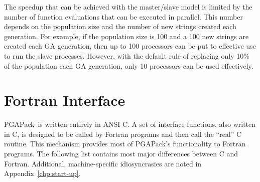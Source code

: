 \documentclass{report}
\newcommand{\pga}{PGAPack}
\begin{document}
The speedup that can be achieved with the master/slave model is limited by the
number of function evaluations that can be executed in parallel.  This number
depends on the population size and the number of new strings created each
generation.  For example, if the population size is 100 and a 100 new strings
are created each GA generation, then up to 100 processors can be put to
effective use to run the slave processes.  However, with the default rule of
replacing only 10\% of the population each GA generation, only 10 processors
can be used effectively.



\chapter{Fortran Interface}\label{chp:fortran}

\pga\ is written entirely in ANSI C.  A set of interface functions, also
written in C, is designed to be called by Fortran programs and then call the
``real'' C routine.  This mechanism provides  most of
\pga's functionality to Fortran programs.  The following list contains most
major differences between C and Fortran.  Additional, machine-specific
idiosyncrasies are noted in Appendix~\ref{chp:start-up}.
\end{document}
